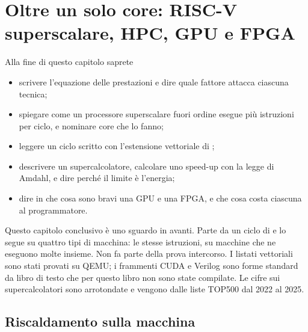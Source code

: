 \chapter{Oltre un solo core: RISC-V superscalare, HPC, GPU e FPGA}
\label{ch:beyond}


\begin{chapgoals}
Alla fine di questo capitolo saprete
\begin{itemize}
\item scrivere l'equazione delle prestazioni e dire quale fattore attacca ciascuna tecnica;
\item spiegare come un processore superscalare fuori ordine esegue più
  istruzioni per ciclo, e nominare core \riscv che lo fanno;
\item leggere un ciclo scritto con l'estensione vettoriale di \riscv;
\item descrivere un supercalcolatore, calcolare uno speed-up con la legge di Amdahl, e dire perché il limite è l'energia;
\item dire in che cosa sono bravi una GPU e una FPGA, e che cosa costa ciascuna al programmatore.
\end{itemize}
\end{chapgoals}


Questo capitolo conclusivo è uno sguardo in avanti. Parte da un ciclo di
\vermone e lo segue su quattro tipi di macchina: le stesse istruzioni, su
macchine che ne eseguono molte insieme. Non fa parte della prova intercorso. I
listati vettoriali \riscv sono stati provati su QEMU; i frammenti CUDA e
Verilog sono forme standard da libro di testo che per questo libro non sono
state compilate. Le cifre sui supercalcolatori sono arrotondate e vengono dalle
liste TOP500 dal 2022 al 2025.

\section{Riscaldamento sulla macchina}


